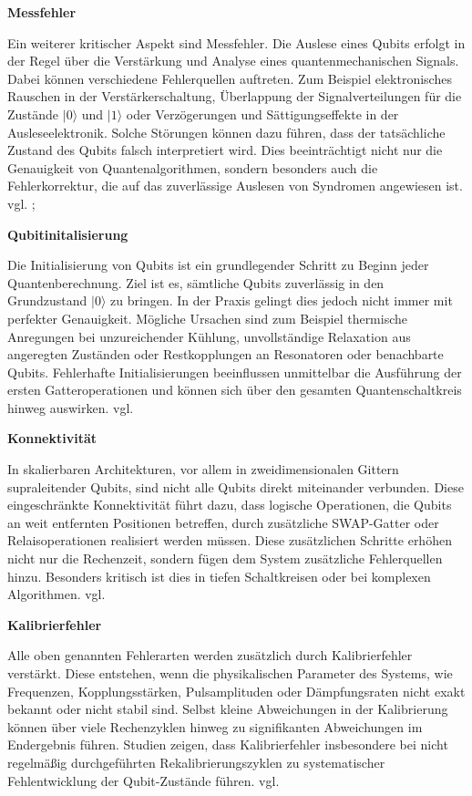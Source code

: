 \textbf{Messfehler}

Ein weiterer kritischer Aspekt sind Messfehler. Die Auslese eines Qubits erfolgt in der Regel über die Verstärkung und Analyse eines quantenmechanischen Signals. Dabei können verschiedene Fehlerquellen auftreten. Zum Beispiel elektronisches Rauschen in der Verstärkerschaltung, Überlappung der Signalverteilungen für die Zustände $|0\rangle$ und $|1\rangle$ oder Verzögerungen und Sättigungseffekte in der Ausleseelektronik. Solche Störungen können dazu führen, dass der tatsächliche Zustand des Qubits falsch interpretiert wird. Dies beeinträchtigt nicht nur die Genauigkeit von Quantenalgorithmen, sondern besonders auch die Fehlerkorrektur, die auf das zuverlässige Auslesen von Syndromen angewiesen ist. vgl. \cite[Seite 49-51]{tutschke_quantencomputing_2023}; \cite[Seite 5-7]{kang_timeadaptive_2025}\medskip



\textbf{Qubitinitalisierung}

Die Initialisierung von Qubits ist ein grundlegender Schritt zu Beginn jeder Quantenberechnung. Ziel ist es, sämtliche Qubits zuverlässig in den Grundzustand $|0\rangle$ zu bringen. In der Praxis gelingt dies jedoch nicht immer mit perfekter Genauigkeit. Mögliche Ursachen sind zum Beispiel thermische Anregungen bei unzureichender Kühlung, unvollständige Relaxation aus angeregten Zuständen oder Restkopplungen an Resonatoren oder benachbarte Qubits. Fehlerhafte Initialisierungen beeinflussen unmittelbar die Ausführung der ersten Gatteroperationen und können sich über den gesamten Quantenschaltkreis hinweg auswirken. vgl. \cite[Seite 3-5]{acharyaQuantumErrorCorrection2025a}\medskip



\textbf{Konnektivität}

In skalierbaren Architekturen, vor allem in zweidimensionalen Gittern supraleitender Qubits, sind nicht alle Qubits direkt miteinander verbunden. Diese eingeschränkte Konnektivität führt dazu, dass logische Operationen, die Qubits an weit entfernten Positionen betreffen, durch zusätzliche SWAP-Gatter oder Relaisoperationen realisiert werden müssen. Diese zusätzlichen Schritte erhöhen nicht nur die Rechenzeit, sondern fügen dem System zusätzliche Fehlerquellen hinzu. Besonders kritisch ist dies in tiefen Schaltkreisen oder bei komplexen Algorithmen. vgl. \cite[Seite 49-51]{tutschke_quantencomputing_2023}\medskip


\textbf{Kalibrierfehler}

Alle oben genannten Fehlerarten werden zusätzlich durch Kalibrierfehler \\verstärkt. Diese entstehen, wenn die physikalischen Parameter des Systems, wie Frequenzen, Kopplungsstärken, Pulsamplituden oder Dämpfungsraten nicht exakt bekannt oder nicht stabil sind. Selbst kleine Abweichungen in der Kalibrierung können über viele Rechenzyklen hinweg zu signifikanten Abweichungen im Endergebnis führen. Studien zeigen, dass Kalibrierfehler insbesondere bei nicht regelmäßig durchgeführten Rekalibrierungszyklen zu systematischer Fehlentwicklung der Qubit-Zustände führen. vgl. \cite[Seite 5-7]{acharyaQuantumErrorCorrection2025a}

